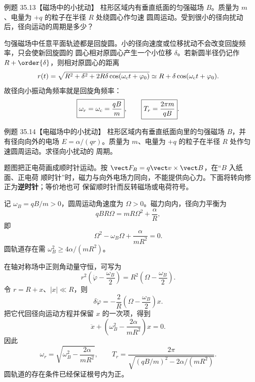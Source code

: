 \Needspace{0.35\textheight}
\begin{origexamplebox}{例题 35.13【磁场中的小扰动】}
柱形区域内有垂直纸面的匀强磁场 $B$。质量为 $m$、电量为 $+q$ 的粒子在半径 $R$ 处绕圆心作匀速
圆周运动。受到很小的径向扰动后，径向运动的周期是多少？
\end{origexamplebox}

\begin{xesolution}
匀强磁场中任意平面轨迹都是回旋圆。小的径向速度或位移扰动不会改变回旋频率，只会使新回旋圆的
圆心相对原圆心产生一个小位移 $\delta$。若新圆半径仍记作 $R+\order{\delta}$，则相对原圆心的距离
\[
  r(t)=\sqrt{R^2+\delta^2+2R\delta\cos(\omega_{\rm c}t+\varphi_0)}
  \simeq R+\delta\cos(\omega_{\rm c}t+\varphi_0).
\]
故径向小振动角频率就是回旋角频率：
\begin{equation}
  \boxed{\omega_r=\omega_{\rm c}=\frac{qB}{m}},
  \qquad
  \boxed{T_r=\frac{2\pi m}{qB}}.
\end{equation}

\epicycleDiagram
\end{xesolution}

\Needspace{0.47\textheight}
\begin{origexamplebox}{例题 35.14【电磁场中的小扰动】}
柱形区域内有垂直纸面向里的匀强磁场 $B$，并有径向向外的电场
$E=\alpha/(qr)$。质量为 $m$、电量为 $+q$ 的粒子在半径 $R$ 处作匀速圆周运动。求径向小扰动的
周期。
\end{origexamplebox}

\begin{xesolution}
题图把正电荷画成顺时针运动。按 $\vect F_B=q\vect v\times\vect B$，在“$B$ 入纸面、正电荷
顺时针”时，磁力与向外电场力同向，不能提供向心力。下面将转向修正为\textbf{逆时针}；等价地也可
保留顺时针而反转磁场或电荷符号。

记 $\omega_B=qB/m>0$，圆周运动角速度为 $\Omega>0$。磁力向内，径向力平衡为
\begin{equation}
  qBR\Omega=mR\Omega^2+\frac\alpha R,
\end{equation}
即
\begin{equation}
  \Omega^2-\omega_B\Omega+\frac{\alpha}{mR^2}=0.
\end{equation}
圆轨道存在需 $\omega_B^2\ge4\alpha/(mR^2)$。

在轴对称场中正则角动量守恒，可写为
\begin{equation}
  r^2\left(\dot\varphi-\frac{\omega_B}{2}\right)
  =R^2\left(\Omega-\frac{\omega_B}{2}\right).
\end{equation}
令 $r=R+x$、$|x|\ll R$，则
\[
  \delta\dot\varphi=-\frac{2}{R}
  \left(\Omega-\frac{\omega_B}{2}\right)x.
\]
把它代回径向运动方程并保留 $x$ 的一次项，得到
\begin{equation}
  \ddot x+\left(\omega_B^2-\frac{2\alpha}{mR^2}\right)x=0.
\end{equation}
因此
\begin{equation}
  \boxed{\omega_r=\sqrt{\omega_B^2-\frac{2\alpha}{mR^2}}},
  \qquad
  \boxed{T_r=\frac{2\pi}{\sqrt{(qB/m)^2-2\alpha/(mR^2)}}}.
\end{equation}
圆轨道的存在条件已经保证根号内为正。

\radialFieldOrbitDiagram
\end{xesolution}

